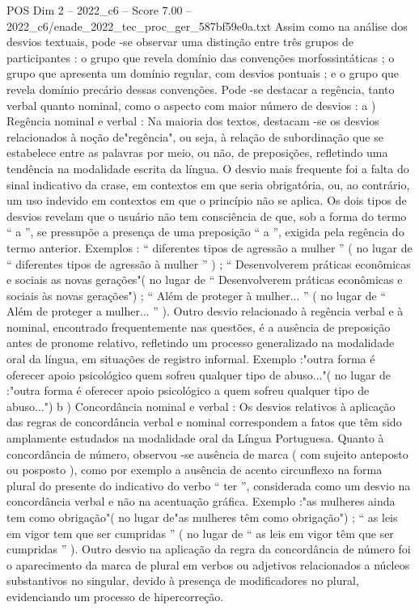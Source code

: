 \begin{textsample}{POS Dim 2 – 2022\_c6 – Score 7.00 – 2022\_c6/enade\_2022\_tec\_proc\_ger\_587bf59e0a.txt}
Assim como na análise dos desvios textuais, pode -se observar uma distinção entre três grupos de participantes : o grupo que revela domínio das convenções morfossintáticas ; o grupo que apresenta um domínio regular, com desvios pontuais ; e o grupo que revela domínio precário dessas convenções.
Pode -se destacar a regência, tanto verbal quanto nominal, como o aspecto com maior número de desvios : a ) Regência nominal e verbal : Na maioria dos textos, destacam -se os desvios relacionados à noção de"regência", ou seja, à relação de subordinação que se estabelece entre as palavras por meio, ou não, de preposições, refletindo uma tendência na modalidade escrita da língua.
O desvio mais frequente foi a falta do sinal indicativo da crase, em contextos em que seria obrigatória, ou, ao contrário, um uso indevido em contextos em que o princípio não se aplica.
Os dois tipos de desvios revelam que o usuário não tem consciência de que, sob a forma do termo “ a ”, se pressupõe a presença de uma preposição “ a ”, exigida pela regência do termo anterior.
Exemplos : “ diferentes tipos de agressão a mulher ” ( no lugar de “ diferentes tipos de agressão à mulher ” ) ; “ Desenvolverem práticas econômicas e sociais as novas gerações"( no lugar de “ Desenvolverem práticas econômicas e sociais às novas gerações") ; “ Além de proteger à mulher... ” ( no lugar de “ Além de proteger a mulher... ” ).
Outro desvio relacionado à regência verbal e à nominal, encontrado frequentemente nas questões, é a ausência de preposição antes de pronome relativo, refletindo um processo generalizado na modalidade oral da língua, em situações de registro informal.
Exemplo :"outra forma é oferecer apoio psicológico quem sofreu qualquer tipo de abuso..."( no lugar de :"outra forma é oferecer apoio psicológico a quem sofreu qualquer tipo de abuso...") b ) Concordância nominal e verbal : Os desvios relativos à aplicação das regras de concordância verbal e nominal correspondem a fatos que têm sido amplamente estudados na modalidade oral da Língua Portuguesa.
Quanto à concordância de número, observou -se ausência de marca ( com sujeito anteposto ou posposto ), como por exemplo a ausência de acento circunflexo na forma plural do presente do indicativo do verbo “ ter ”, considerada como um desvio na concordância verbal e não na acentuação gráfica.
Exemplo :"as mulheres ainda tem como obrigação"( no lugar de"as mulheres têm como obrigação") ; “ as leis em vigor tem que ser cumpridas ” ( no lugar de “ as leis em vigor têm que ser cumpridas ” ).
Outro desvio na aplicação da regra da concordância de número foi o aparecimento da marca de plural em verbos ou adjetivos relacionados a núcleos substantivos no singular, devido à presença de modificadores no plural, evidenciando um processo de hipercorreção.

\end{textsample}
